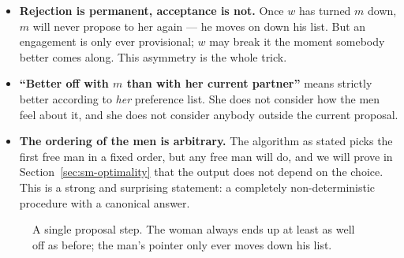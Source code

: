\begin{itemize}
  \item \textbf{Rejection is permanent, acceptance is not.} Once $w$ has
        turned $m$ down, $m$ will never propose to her again --- he moves on
        down his list. But an engagement is only ever provisional; $w$ may
        break it the moment somebody better comes along. This asymmetry is the
        whole trick.
  \item \textbf{``Better off with $m$ than with her current partner''} means
        strictly better according to \emph{her} preference list. She does not
        consider how the men feel about it, and she does not consider anybody
        outside the current proposal.
  \item \textbf{The ordering of the men is arbitrary.} The algorithm as stated
        picks the first free man in a fixed order, but any free man will do,
        and we will prove in Section~\ref{sec:sm-optimality} that the output does
        not depend on the choice. This is a strong and surprising statement:
        a completely non-deterministic procedure with a canonical answer.
\end{itemize}

\begin{figure}[ht]
\centering
{}
\caption{A single proposal step. The woman always ends up at least as well off
as before; the man's pointer only ever moves down his list.}
\label{fig:sm-step}
\end{figure}

